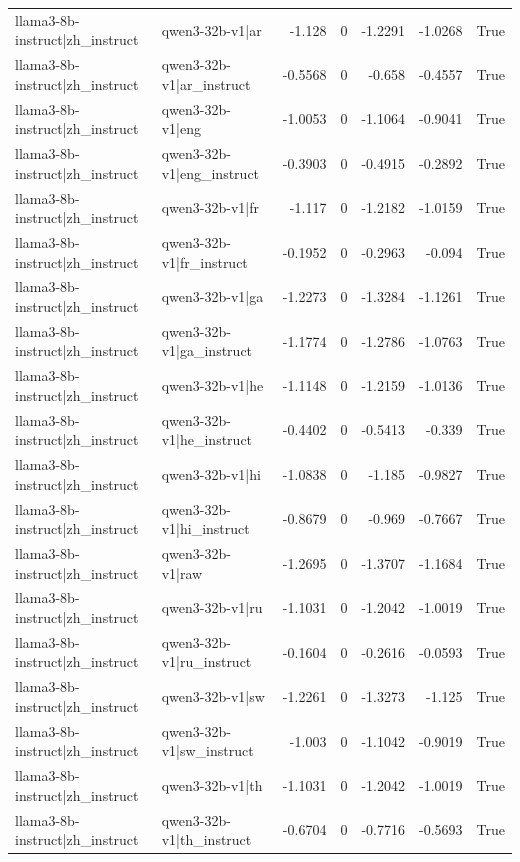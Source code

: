 \begin{table}
\begin{tabular}{l l r r r r l}
llama3-8b-instruct|zh_instruct & qwen3-32b-v1|ar & -1.128 & 0 & -1.2291 & -1.0268 & True \\
llama3-8b-instruct|zh_instruct & qwen3-32b-v1|ar_instruct & -0.5568 & 0 & -0.658 & -0.4557 & True \\
llama3-8b-instruct|zh_instruct & qwen3-32b-v1|eng & -1.0053 & 0 & -1.1064 & -0.9041 & True \\
llama3-8b-instruct|zh_instruct & qwen3-32b-v1|eng_instruct & -0.3903 & 0 & -0.4915 & -0.2892 & True \\
llama3-8b-instruct|zh_instruct & qwen3-32b-v1|fr & -1.117 & 0 & -1.2182 & -1.0159 & True \\
llama3-8b-instruct|zh_instruct & qwen3-32b-v1|fr_instruct & -0.1952 & 0 & -0.2963 & -0.094 & True \\
llama3-8b-instruct|zh_instruct & qwen3-32b-v1|ga & -1.2273 & 0 & -1.3284 & -1.1261 & True \\
llama3-8b-instruct|zh_instruct & qwen3-32b-v1|ga_instruct & -1.1774 & 0 & -1.2786 & -1.0763 & True \\
llama3-8b-instruct|zh_instruct & qwen3-32b-v1|he & -1.1148 & 0 & -1.2159 & -1.0136 & True \\
llama3-8b-instruct|zh_instruct & qwen3-32b-v1|he_instruct & -0.4402 & 0 & -0.5413 & -0.339 & True \\
llama3-8b-instruct|zh_instruct & qwen3-32b-v1|hi & -1.0838 & 0 & -1.185 & -0.9827 & True \\
llama3-8b-instruct|zh_instruct & qwen3-32b-v1|hi_instruct & -0.8679 & 0 & -0.969 & -0.7667 & True \\
llama3-8b-instruct|zh_instruct & qwen3-32b-v1|raw & -1.2695 & 0 & -1.3707 & -1.1684 & True \\
llama3-8b-instruct|zh_instruct & qwen3-32b-v1|ru & -1.1031 & 0 & -1.2042 & -1.0019 & True \\
llama3-8b-instruct|zh_instruct & qwen3-32b-v1|ru_instruct & -0.1604 & 0 & -0.2616 & -0.0593 & True \\
llama3-8b-instruct|zh_instruct & qwen3-32b-v1|sw & -1.2261 & 0 & -1.3273 & -1.125 & True \\
llama3-8b-instruct|zh_instruct & qwen3-32b-v1|sw_instruct & -1.003 & 0 & -1.1042 & -0.9019 & True \\
llama3-8b-instruct|zh_instruct & qwen3-32b-v1|th & -1.1031 & 0 & -1.2042 & -1.0019 & True \\
llama3-8b-instruct|zh_instruct & qwen3-32b-v1|th_instruct & -0.6704 & 0 & -0.7716 & -0.5693 & True \\

\end{tabular}
\end{table}
